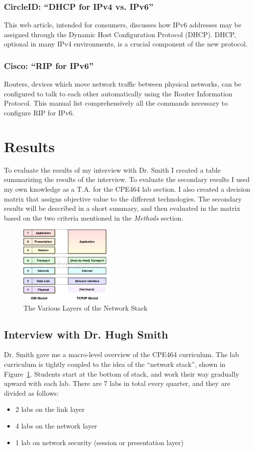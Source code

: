 \documentclass[12pt]{article}
\begin{document}
\subsubsection{CircleID: ``DHCP for IPv4 vs. IPv6''}
This web article, intended for consumers, discusses how IPv6 addresses may be assigned through the Dynamic Host Configuration Protocol (DHCP). DHCP, optional in many IPv4 environments, is a crucial component of the new protocol.

\subsubsection{Cisco: ``RIP for IPv6''}
Routers, devices which move network traffic between physical networks, can be configured to talk to each other automatically using the Router Information Protocol. This manual list comprehensively all the commands necessary to configure RIP for IPv6.

\section{Results}
To evaluate the results of my interview with Dr. Smith I created a table summarizing the results of the interview. To evaluate the secondary results I used my own knowledge as a T.A. for the CPE464 lab section. I also created a decision matrix that assigns objective value to the different technologies. The secondary results will be described in a short summary, and then evaluated in the matrix based on the two criteria mentioned in the \textit{Methods} section.

\begin{figure}[ht!]
  \centering
  \includegraphics[width=0.4\textwidth]{the_stack.png}
  \caption{The Various Layers of the Network Stack}
  \label{fig:the_stack}
\end{figure}

\subsection{Interview with Dr. Hugh Smith}
Dr. Smith gave me a macro-level overview of the CPE464 curriculum. The lab curriculum is tightly coupled to the idea of the ``network stack'', shown in Figure~\ref{fig:the_stack}. Students start at the bottom of stack, and work their way gradually upward with each lab. There are 7 labs in total every quarter, and they are divided as follows:
\begin{itemize}
\item 2 labs on the link layer
\item 4 labs on the network layer
\item 1 lab on network security (session or presentation layer)
\end{itemize}
\end{document}
